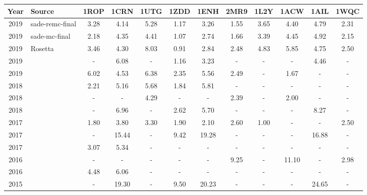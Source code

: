 \begin{sidewaystable}
  \begin{tabular}{c|l|c|c|c|c|c|c|c|c|c|c} \hline \hline
    Year & Source                            & 1ROP  & 1CRN  & 1UTG  & 1ZDD & 1ENH  & 2MR9 & 1L2Y & 1ACW  & 1AIL  & 1WQC \\ \hline \hline
%
    2019 & sade-remc-final                   & 3.28  & 4.14  & 5.28  & 1.17 & 3.26  & 1.55 & 3.65 & 4.40  & 4.79  & 2.31 \\ \hline
    2019 & sade-mc-final                     & 2.18  & 4.35  & 4.41  & 1.07 & 2.74  & 1.66 & 3.39 & 4.45  & 4.92  & 2.15 \\ \hline
%
    2019 & Rosetta                           & 3.46  & 4.30  & 8.03  & 0.91 & 2.84  & 2.48 & 4.83 & 5.85  & 4.75  & 2.50 \\ \hline
%
    2019 & {\cite{silva2019self}}            & -     & 6.08  & -     & 1.16 & 3.23  & -    & -    & -     & 4.46  & -    \\ \hline
    2019 & {\cite{narloch2019knowledge}}     & 6.02  & 4.53  & 6.38  & 2.35 & 5.56  & 2.49 & -    & 1.67  & -     & -    \\ \hline
    2018 & {\cite{song2018adoption}}         & 2.21  & 5.16  & 5.68  & 1.84 & 5.81  & -    & -    & -     & -     & -    \\ \hline
    2018 & {\cite{borguesan2018genetic}}     & -     & -     & 4.29  & -    & -     & 2.39 & -    & 2.00  & -     & -    \\ \hline
    2018 & {\cite{silva2018multistage}}      & -     & 6.96  & -     & 2.62 & 5.70  & -    & -    & -     & 8.27  & -    \\ \hline
    2017 & {\cite{de2018three}}              & 1.80  & 3.80  & 3.30  & 1.90 & 2.10  & 2.60 & 1.00 & -     & -     & 2.50 \\ \hline
    2017 & {\cite{narloch2017protein}}       & -     & 15.44 & -     & 9.42 & 19.28 & -    & -    & -     & 16.88 & -    \\ \hline
    2017 & {\cite{gao2018incorporation}}     & 3.07  & 5.34  & -     & -    & -     & -    & -    & -     & -     & -    \\ \hline
    2016 & {\cite{borguesan2016improving}}   & -     & -     & -     & -    & -     & 9.25 & -    & 11.10 & -     & 2.98 \\ \hline
    2016 & {\cite{venske2016ademo}}          & 4.48  & 6.06  & -     & -    & -     & -    & -    & -     & -     & -    \\ \hline
    2015 & {\cite{borguesan2015apl}}         & -     & 19.30 & -     & 9.50 & 20.23 & -    & -    & -     & 24.65 & -    \\ \hline

\end{tabular}
\end{sidewaystable}
